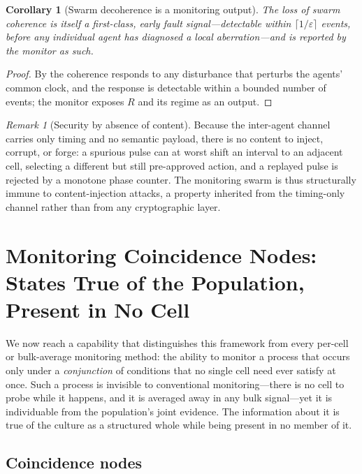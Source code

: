\documentclass[11pt,twocolumn,a4paper]{article}
\theoremstyle{thmstyle}
\newtheorem{corollary}[theorem]{Corollary}
\theoremstyle{definition}
\theoremstyle{remark}
\newtheorem{remark}[theorem]{Remark}
\newcommand{\Rens}{R}
\newcommand{\eps}{\varepsilon}
\begin{document}
\begin{corollary}[Swarm decoherence is a monitoring output]
\label{cor:decoherence-output}
The loss of swarm coherence is itself a first-class, early fault
signal---detectable within $\lceil1/\eps\rceil$ events, before any
individual agent has diagnosed a local aberration---and is reported by the
monitor as such.
\end{corollary}

\begin{proof}
By  the coherence responds to any disturbance that
perturbs the agents' common clock, and the response is detectable within a
bounded number of events; the monitor exposes $\Rens$ and its regime as an
output.
\end{proof}

\begin{remark}[Security by absence of content]
\label{rem:security}
Because the inter-agent channel carries only timing and no semantic
payload, there is no content to inject, corrupt, or forge: a spurious pulse
can at worst shift an interval to an adjacent cell, selecting a different
but still pre-approved action, and a replayed pulse is rejected by a
monotone phase counter. The monitoring swarm is thus structurally immune to
content-injection attacks, a property inherited from the timing-only
channel rather than from any cryptographic layer.
\end{remark}


\section{Monitoring Coincidence Nodes: States True of the Population,
Present in No Cell}
\label{sec:coincidence}

We now reach a capability that distinguishes this framework from every
per-cell or bulk-average monitoring method: the ability to monitor a
process that occurs only under a \emph{conjunction} of conditions that no
single cell need ever satisfy at once. Such a process is invisible to
conventional monitoring---there is no cell to probe while it happens, and it
is averaged away in any bulk signal---yet it is individuable from the
population's joint evidence. The information about it is true of the culture
as a structured whole while being present in no member of it.

\subsection{Coincidence nodes}
\end{document}
